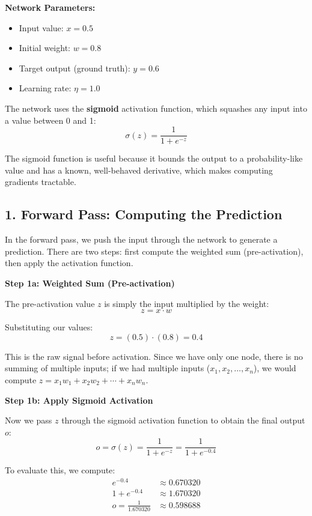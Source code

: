 \documentclass[12pt]{article}
\begin{document}
\vspace{0.3cm}

\noindent\textbf{Network Parameters:}
\begin{itemize}
    \item Input value: $x = 0.5$
    \item Initial weight: $w = 0.8$
    \item Target output (ground truth): $y = 0.6$
    \item Learning rate: $\eta = 1.0$
\end{itemize}

The network uses the \textbf{sigmoid} activation function, which squashes any input into a value between 0 and 1:
\[
\sigma(z) = \frac{1}{1 + e^{-z}}
\]

The sigmoid function is useful because it bounds the output to a probability-like value and has a known, well-behaved derivative, which makes computing gradients tractable.

\subsection*{1. Forward Pass: Computing the Prediction}

In the forward pass, we push the input through the network to generate a prediction. There are two steps: first compute the weighted sum (pre-activation), then apply the activation function.

\vspace{0.2cm}

\noindent\textbf{Step 1a: Weighted Sum (Pre-activation)}

The pre-activation value $z$ is simply the input multiplied by the weight:
\[
z = x \cdot w
\]

Substituting our values:
\[
z = (0.5) \cdot (0.8) = 0.4
\]

This is the raw signal before activation. Since we have only one node, there is no summing of multiple inputs; if we had multiple inputs ($x_1, x_2, \ldots, x_n$), we would compute $z = x_1 w_1 + x_2 w_2 + \cdots + x_n w_n$.

\vspace{0.2cm}

\noindent\textbf{Step 1b: Apply Sigmoid Activation}

Now we pass $z$ through the sigmoid activation function to obtain the final output $o$:
\[
o = \sigma(z) = \frac{1}{1 + e^{-z}} = \frac{1}{1 + e^{-0.4}}
\]

To evaluate this, we compute:
\begin{align*}
e^{-0.4} &\approx 0.670320 \\
1 + e^{-0.4} &\approx 1.670320 \\
o = \frac{1}{1.670320} &\approx 0.598688
\end{align*}
\end{document}
